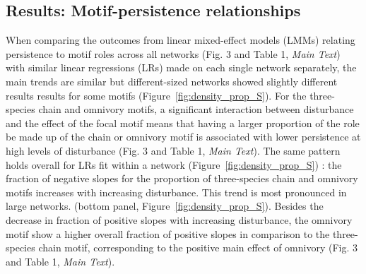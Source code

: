 \documentclass[12pt]{article}
\begin{document}
\begin{spacing}{2.0}
\clearpage


\section{Results: Motif-persistence relationships}

    When comparing the outcomes from linear mixed-effect models (LMMs) relating persistence to motif roles across all networks (Fig. 3 and Table 1, \emph{Main Text}) with similar linear regressions (LRs) made on each single network separately, the main trends are similar but different-sized networks showed slightly different results results for some motifs (Figure~\ref{fig:density_prop_S}).
    For the three-species chain and omnivory motifs, a significant interaction between disturbance and the effect of the focal motif means that having a larger proportion of the role be made up of the chain or omnivory motif is associated with lower persistence at high levels of disturbance (Fig. 3 and Table 1, \emph{Main Text}). 
    The same pattern holds overall for LRs fit within a network  (Figure~\ref{fig:density_prop_S})
    : the fraction of negative slopes for the proportion of three-species chain and omnivory motifs increases with increasing disturbance. 
    This trend is most pronounced in large networks. (bottom panel, Figure~\ref{fig:density_prop_S}). 
    Besides the decrease in fraction of positive slopes with increasing disturbance, the omnivory motif show a higher overall fraction of positive slopes in comparison to the three-species chain motif, corresponding to the positive main effect of omnivory (Fig. 3 and Table 1, \emph{Main Text}). 
    

\end{spacing}
\end{document}
